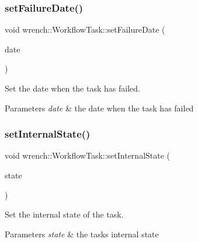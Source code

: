 \subsubsection{\texorpdfstring{set\+Failure\+Date()}{setFailureDate()}}
{\footnotesize\ttfamily void wrench\+::\+Workflow\+Task\+::set\+Failure\+Date (\begin{DoxyParamCaption}\item[{double}]{date }\end{DoxyParamCaption})}



Set the date when the task has failed. 


\begin{DoxyParams}{Parameters}
{\em date} & the date when the task has failed \\
\hline
\end{DoxyParams}
\mbox{\label{classwrench_1_1_workflow_task_a6747db4a0eb51f1017f55345d7a5e2d9}} 
\subsubsection{\texorpdfstring{set\+Internal\+State()}{setInternalState()}}
{\footnotesize\ttfamily void wrench\+::\+Workflow\+Task\+::set\+Internal\+State (\begin{DoxyParamCaption}\item[{\hyperlink{classwrench_1_1_workflow_task_aa2b860941b37263c26385fd076502e04}{Workflow\+Task\+::\+Internal\+State}}]{state }\end{DoxyParamCaption})}



Set the internal state of the task. 


\begin{DoxyParams}{Parameters}
{\em state} & the task\textquotesingle{}s internal state \\
\hline
\end{DoxyParams}
\mbox{\label{classwrench_1_1_workflow_task_a394474528d099540156d756621d1050f}} 
